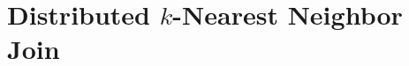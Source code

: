 \section{Distributed $k$-Nearest Neighbor Join}\label{subchap:1_1}

\graphicspath{{BigData2015/}}







